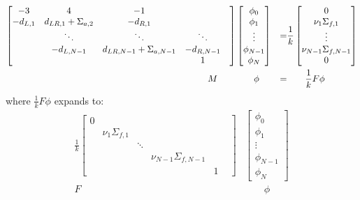\documentclass[12pt]{article}
\begin{document}
\begin{equation}
    \label{eq:prob3-matrix}
    \begin{aligned}
    \begin{bmatrix}
        -3 & 4 & -1 &  \\
        -d_{L,1} & d_{LR,1}+\Sigma_{a,2} & -d_{R,1} &&\\
        &\ddots& \ddots & \ddots\\
        &-d_{L,N-1} & d_{LR,N-1}+\Sigma_{a,N-1} & -d_{R,N-1}\\
        &&&1
    \end{bmatrix}&
    \begin{bmatrix}
        \phi_0\\\phi_1\\\vdots\\\phi_{N-1}\\\phi_N
    \end{bmatrix}
    &=&
    \frac{1}{k}
    \begin{bmatrix}
        0\\\nu_1\Sigma_{f,1}\\\vdots\\\nu_{N-1}\Sigma_{f,N-1}\\0
    \end{bmatrix} \\
    M\qquad&\qquad \phi&=&\qquad \frac{1}{k}F\phi
    \end{aligned}
\end{equation}
where $\frac{1}{k}F\phi$ expands to:
\begin{equation}
    \begin{split}
    \frac{1}{k}
    \begin{bmatrix}
        0 & &  & & & \\
        & \nu_1\Sigma_{f,1} & &&\\
        && \ddots &\\
        &&& \nu_{N-1}\Sigma_{f,N-1} &\\
        &&&&1
    \end{bmatrix}&
    \begin{bmatrix}
        \phi_0\\\phi_1\\\vdots\\\phi_{N-1}\\\phi_N
    \end{bmatrix}\\
    F\qquad&\qquad \phi
    \end{split}
\end{equation}
\end{document}
